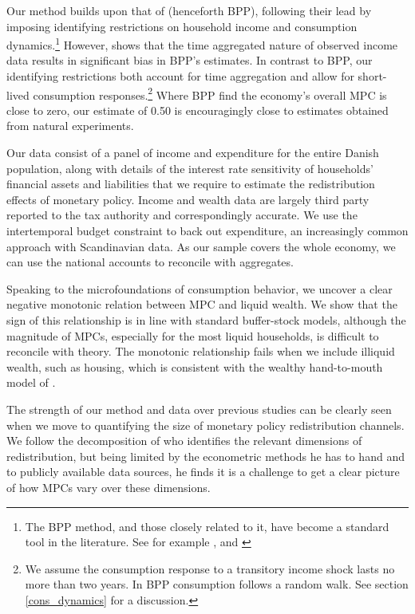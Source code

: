 \documentclass[titlepage]{\econtex}\newcommand{\texname}{ConsumptionHeterogeneity}
\begin{document}
Our method builds upon that of \cite{blundell_consumption_2008} (henceforth BPP), following their lead by imposing identifying restrictions on household income and consumption dynamics.\footnote{The BPP method, and those closely related to it, have become a standard tool in the literature. See for example \cite{violante_wealthy_2014}, \cite{auclert_monetary_2017} and \cite{manovskii_how_2017}} However, \cite{crawley_time_2018} shows that the time aggregated nature of observed income data results in significant bias in BPP's estimates. In contrast to BPP, our identifying restrictions both account for time aggregation and allow for short-lived consumption responses.\footnote{We assume the consumption response to a transitory income shock lasts no more than two years. In BPP consumption follows a random walk. See section \ref{cons_dynamics} for a discussion.} Where BPP find the economy's overall MPC is close to zero, our estimate of 0.50 is encouragingly close to estimates obtained from natural experiments.

Our data consist of a panel of income and expenditure for the entire Danish population, along with details of the interest rate sensitivity of households' financial assets and liabilities that we require to estimate the redistribution effects of monetary policy. Income and wealth data are largely third party reported to the tax authority and correspondingly accurate. We use the intertemporal budget constraint to back out expenditure, an increasingly common approach with Scandinavian data. As our sample covers the whole economy, we can use the national accounts to reconcile with aggregates.

Speaking to the microfoundations of consumption behavior, we uncover a clear negative monotonic relation between MPC and liquid wealth. We show that the sign of this relationship is in line with standard buffer-stock models, although the magnitude of MPCs, especially for the most liquid households, is difficult to reconcile with theory. The monotonic relationship fails when we include illiquid wealth, such as housing, which is consistent with the wealthy hand-to-mouth model of \cite{violante_wealthy_2014}.

The strength of our method and data over previous studies can be clearly seen when we move to quantifying the size of monetary policy redistribution channels. We follow the decomposition of \cite{auclert_monetary_2017} who identifies the relevant dimensions of redistribution, but being limited by the econometric methods he has to hand and to publicly available data sources, he finds it is a challenge to get a clear picture of how MPCs vary over these dimensions.
\end{document}

